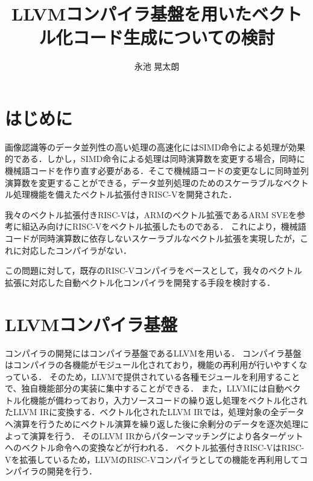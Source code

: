 ﻿\documentclass[a4j]{jarticle}
\title{LLVMコンパイラ基盤を用いたベクトル化コード生成についての検討}
\author{永池 晃太朗}
\begin{document}
\maketitle

\section{はじめに}
画像認識等のデータ並列性の高い処理の高速化にはSIMD命令による処理が効果的である．しかし，SIMD命令による処理は同時演算数を変更する場合，同時に機械語コードを作り直す必要がある．そこで機械語コードの変更なしに同時並列演算数を変更することができる，データ並列処理のためのスケーラブルなベクトル処理機能を備えたベクトル拡張付きRISC-Vを開発された\cite{bib:kimura}．

我々のベクトル拡張付きRISC-Vは，ARMのベクトル拡張であるARM SVE\cite{bib:arm_sve}を参考に組込み向けにRISC-V\cite{bib:risc-v}をベクトル拡張したものである．
これにより，機械語コードが同時演算数に依存しないスケーラブルなベクトル拡張を実現したが，これに対応したコンパイラがない．

この問題に対して，既存のRISC-Vコンパイラをベースとして，我々のベクトル拡張に対応した自動ベクトル化コンパイラを開発する手段を検討する．

%
%
%

\section{LLVMコンパイラ基盤}
コンパイラの開発にはコンパイラ基盤であるLLVM\cite{bib:llvm}を用いる．
コンパイラ基盤はコンパイラの各機能がモジュール化されており，機能の再利用が行いやすくなっている．
そのため，LLVMで提供されている各種モジュールを利用することで、独自機能部分の実装に集中することができる．
また，LLVMには自動ベクトル化機能が備わっており，入力ソースコードの繰り返し処理をベクトル化されたLLVM IRに変換する．ベクトル化されたLLVM IRでは，処理対象の全データへ演算を行うためにベクトル演算を繰り返した後に余剰分のデータを逐次処理によって演算を行う．
そのLLVM IRからパターンマッチングにより各ターゲットへのベクトル命令への変換などが行われる．
ベクトル拡張付きRISC-VはRISC-Vを拡張しているため，LLVMのRISC-Vコンパイラとしての機能を再利用してコンパイラの開発を行う．
\end{document}
